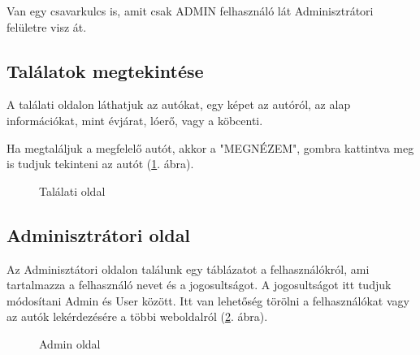 Van egy csavarkulcs is, amit csak ADMIN felhasználó lát Adminisztrátori felületre visz át.

\subsection{Találatok megtekintése}

A találati oldalon láthatjuk az autókat, egy képet az autóról, az alap információkat, mint évjárat, lóerő, vagy a köbcenti.

Ha megtaláljuk a megfelelő autót, akkor a "MEGNÉZEM", gombra kattintva meg is tudjuk tekinteni az autót (\ref{fig:Talalatok}. ábra).
\newpage

\begin{figure}[h]
\centering
{}
\caption{Találati oldal}
\label{fig:Talalatok}
\end{figure}

\subsection{Adminisztrátori oldal}

Az Adminisztátori oldalon találunk egy táblázatot a felhasználókról, ami tartalmazza a felhasználó nevet és a jogosultságot. A jogosultságot itt tudjuk módosítani Admin és User között. Itt van lehetőség törölni a felhasználókat vagy az autók lekérdezésére a többi weboldalról (\ref{fig:Admin}. ábra).

\begin{figure}[h]
\centering
{}
\caption{Admin oldal}
\label{fig:Admin}
\end{figure}
\newpage

